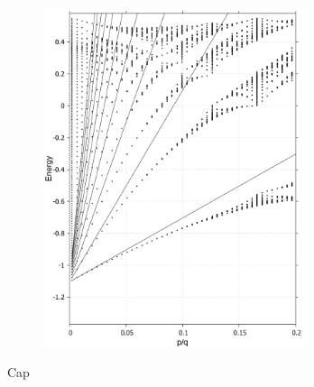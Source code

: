 \documentclass{report}
\begin{document}
\begin{figure}[htb]
\begin{subfigure}[b]{0.495\textwidth}
		\includegraphics[width=0.85\textwidth,height=1.2\linewidth]{pic/landaulevel_h0_q_453.pdf}
		\label{fig:1 landau level 2}
	\end{subfigure}
	\caption{
		Cap  
	}
\end{figure}



	
	
\nocite{*}
\renewcommand{\bibname}{REFERENCES}

	
\end{document}
